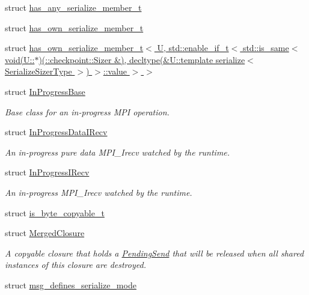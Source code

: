 \begin{DoxyCompactItemize}
struct \hyperlink{structvt_1_1messaging_1_1has__any__serialize__member__t}{has\+\_\+any\+\_\+serialize\+\_\+member\+\_\+t}
\item 
struct \hyperlink{structvt_1_1messaging_1_1has__own__serialize__member__t}{has\+\_\+own\+\_\+serialize\+\_\+member\+\_\+t}
\item 
struct \hyperlink{structvt_1_1messaging_1_1has__own__serialize__member__t_3_01_u_00_01std_1_1enable__if__t_3_01std8741339fbc39701010cb527cee7ae844}{has\+\_\+own\+\_\+serialize\+\_\+member\+\_\+t$<$ U, std\+::enable\+\_\+if\+\_\+t$<$ std\+::is\+\_\+same$<$ void(\+U\+::$\ast$)(\+::checkpoint\+::\+Sizer \&), decltype(\&\+U\+::template serialize$<$ Serialize\+Sizer\+Type $>$) $>$\+::value $>$ $>$}
\item 
struct \hyperlink{structvt_1_1messaging_1_1_in_progress_base}{In\+Progress\+Base}
\begin{DoxyCompactList}\small\item\em Base class for an in-\/progress M\+PI operation. \end{DoxyCompactList}\item 
struct \hyperlink{structvt_1_1messaging_1_1_in_progress_data_i_recv}{In\+Progress\+Data\+I\+Recv}
\begin{DoxyCompactList}\small\item\em An in-\/progress pure data M\+P\+I\+\_\+\+Irecv watched by the runtime. \end{DoxyCompactList}\item 
struct \hyperlink{structvt_1_1messaging_1_1_in_progress_i_recv}{In\+Progress\+I\+Recv}
\begin{DoxyCompactList}\small\item\em An in-\/progress M\+P\+I\+\_\+\+Irecv watched by the runtime. \end{DoxyCompactList}\item 
struct \hyperlink{structvt_1_1messaging_1_1is__byte__copyable__t}{is\+\_\+byte\+\_\+copyable\+\_\+t}
\item 
struct \hyperlink{structvt_1_1messaging_1_1_merged_closure}{Merged\+Closure}
\begin{DoxyCompactList}\small\item\em A copyable closure that holds a {\ttfamily \hyperlink{structvt_1_1messaging_1_1_pending_send}{Pending\+Send}} that will be released when all shared instances of this closure are destroyed. \end{DoxyCompactList}\item 
struct \hyperlink{structvt_1_1messaging_1_1msg__defines__serialize__mode}{msg\+\_\+defines\+\_\+serialize\+\_\+mode}

\end{DoxyCompactItemize}
